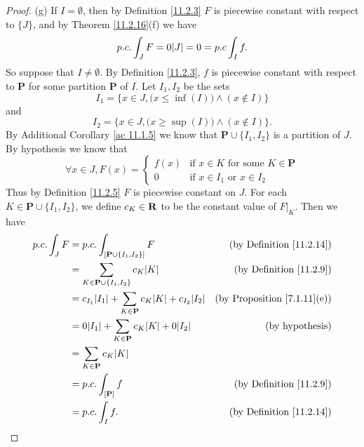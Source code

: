 \begin{proof}{(g)}
    If \(I = \emptyset\), then by Definition \ref{11.2.3} \(F\) is piecewise constant with respect to \(\{J\}\), and by Theorem \ref{11.2.16}(f) we have
    \[
        p.c. \int_J F = 0 \abs{J} = 0 = p.c \int_I f.
    \]
    So suppose that \(I \neq \emptyset\).
    By Definition \ref{11.2.3}, \(f\) is piecewise constant with respect to \(\mathbf{P}\) for some partition \(\mathbf{P}\) of \(I\).
    Let \(I_1, I_2\) be the sets
    \[
        I_1 = \Big\{x \in J, \big(x \leq \inf(I)\big) \land (x \notin I)\Big\}
    \]
    and
    \[
        I_2 = \Big\{x \in J, \big(x \geq \sup(I)\big) \land (x \notin I)\Big\}.
    \]
    By Additional Corollary \ref{ac 11.1.5} we know that \(\mathbf{P} \cup \{I_1, I_2\}\) is a partition of \(J\).
    By hypothesis we know that
    \[
        \forall x \in J, F(x) = \begin{cases}
            f(x) & \text{if } x \in K \text{ for some } K \in \mathbf{P} \\
            0    & \text{if } x \in I_1 \text{ or } x \in I_2
        \end{cases}
    \]
    Thus by Definition \ref{11.2.5} \(F\) is piecewise constant on \(J\).
    For each \(K \in \mathbf{P} \cup \{I_1, I_2\}\), we define \(c_K \in \mathbf{R}\) to be the constant value of \(F|_K\).
    Then we have
    \begin{align*}
        p.c. \int_J F & = p.c. \int_{[\mathbf{P} \cup \{I_1, I_2\}]} F                                & \text{(by Definition \ref{11.2.14})}    \\
                      & = \sum_{K \in \mathbf{P} \cup \{I_1, I_2\}} c_K \abs{K}                       & \text{(by Definition \ref{11.2.9})}     \\
                      & = c_{I_1} \abs{I_1} + \sum_{K \in \mathbf{P}} c_K \abs{K} + c_{I_2} \abs{I_2} & \text{(by Proposition \ref{7.1.11}(e))} \\
                      & = 0 \abs{I_1} + \sum_{K \in \mathbf{P}} c_K \abs{K} + 0 \abs{I_2}             & \text{(by hypothesis)}                  \\
                      & = \sum_{K \in \mathbf{P}} c_K \abs{K}                                                                                   \\
                      & = p.c. \int_{[\mathbf{P}]} f                                                  & \text{(by Definition \ref{11.2.9})}     \\
                      & = p.c. \int_I f.                                                              & \text{(by Definition \ref{11.2.14})}
    \end{align*}
\end{proof}

